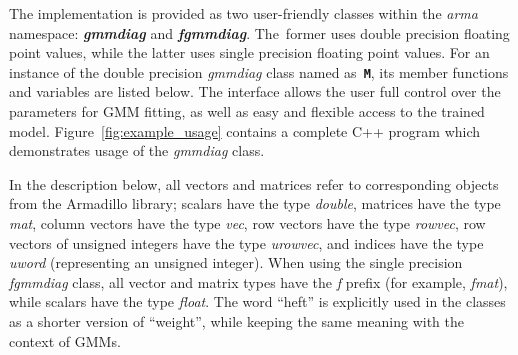 \documentclass[10pt,a4paper]{article}
\def\_{{\tt\char95}}
\begin{document}
The implementation is provided as two user-friendly classes within the {\it arma} namespace:
{\it\bfseries gmm\_diag} and {\it\bfseries fgmm\_diag}.
The~former uses double precision floating point values, while the latter uses single precision floating point values.
For an instance of the double precision {\it gmm\_diag} class named as~{\tt\bfseries M},
its member functions and variables are listed below.
The interface allows the user full control over the parameters for GMM fitting,
as well as easy and flexible access to the trained model.
Figure~\ref{fig:example_usage} contains a complete C++ program which demonstrates usage of the {\it gmm\_diag} class.

In the description below, all vectors and matrices refer to corresponding objects from the Armadillo library;
scalars have the type {\it double},
matrices have the type {\it mat},
column vectors have the type {\it vec},
row vectors have the type {\it rowvec},
row vectors of unsigned integers have the type {\it urowvec},
and indices have the type {\it uword} (representing an unsigned integer).
When using the single precision {\it fgmm\_diag} class,
all vector and matrix types have the {\it f} prefix (for example, {\it fmat}),
while scalars have the type {\it float}.
The word ``heft'' is explicitly used in the classes as a shorter version of ``weight'', while keeping the same meaning with the context of GMMs.
\end{document}
